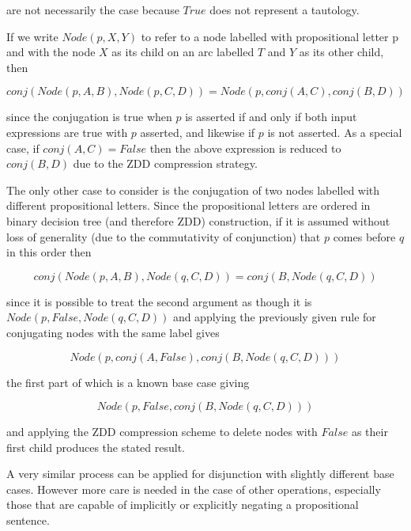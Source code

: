 \documentclass[12pt,a4paper,twoside,openright]{report}
\begin{document}
are not necessarily the case because $\mathit{True}$ does not represent a tautology.

If we write $\mathit{Node}(p, X, Y)$ to refer to a node labelled with propositional letter p and with the node $X$ as its child on an arc labelled $T$ and $Y$ as its other child, then

$$
\mathit{conj}(\mathit{Node}(p, A, B), \mathit{Node}(p, C, D)) = \mathit{Node}(p, \mathit{conj}(A,C), \mathit{conj}(B,D))
$$

since the conjugation is true when $p$ is asserted if and only if both input expressions are true with $p$ asserted, and likewise if $p$ is not asserted. As a special case, if $\mathit{conj}(A,C) = \mathit{False}$ then the above expression is reduced to $\mathit{conj}(B,D)$ due to the ZDD compression strategy.

The only other case to consider is the conjugation of two nodes labelled with different propositional letters. Since the propositional letters are ordered in binary decision tree (and therefore ZDD) construction, if it is assumed without loss of generality (due to the commutativity of conjunction) that $p$ comes before $q$ in this order then 

$$
\mathit{conj}(\mathit{Node}(p, A, B), \mathit{Node}(q, C, D)) = \mathit{conj}(B, \mathit{Node}(q, C, D))
$$

since it is possible to treat the second argument as though it is $\mathit{Node}(p, False, \mathit{Node}(q, C, D))$ and applying the previously given rule for conjugating nodes with the same label gives

$$
\mathit{Node}(p, \mathit{conj}(A, False), \mathit{conj}(B, \mathit{Node}(q, C, D)))
$$

the first part of which is a known base case giving

$$
\mathit{Node}(p, False, \mathit{conj}(B, \mathit{Node}(q, C, D)))
$$

and applying the ZDD compression scheme to delete nodes with $\mathit{False}$ as their first child produces the stated result.

A very similar process can be applied for disjunction with slightly different base cases. However more care is needed in the case of other operations, especially those that are capable of implicitly or explicitly negating a propositional sentence.
\end{document}
